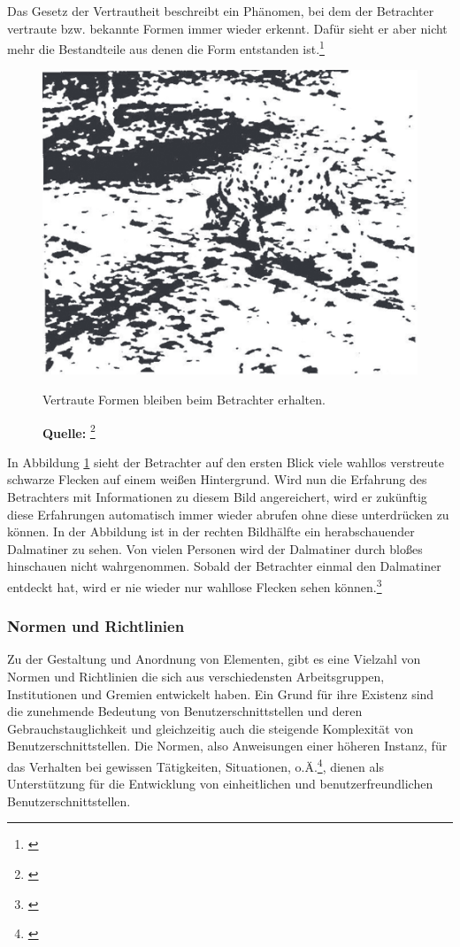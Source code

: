 Das Gesetz der Vertrautheit beschreibt ein Phänomen, bei dem der Betrachter vertraute bzw. bekannte Formen immer wieder erkennt. Dafür sieht er aber nicht mehr die Bestandteile aus denen die Form entstanden ist.\footnote{\cite[vgl.][63f]{Dahm2006}}
\begin{figure}[H]
  \centering
  \includegraphics[scale=0.7]{img/gesetz_der_Vertrautheit.PNG}
  \caption{Vertraute Formen bleiben beim Betrachter erhalten.}
  \caption*{\textbf{Quelle:} \footnote{\cite{Dahm2006}}}
  \label{fig:vertrautheit}
\end{figure}
In Abbildung \ref{fig:vertrautheit} sieht der Betrachter auf den ersten Blick viele wahllos verstreute schwarze Flecken auf einem weißen Hintergrund. Wird nun die Erfahrung des Betrachters mit Informationen zu diesem Bild angereichert, wird er zukünftig diese Erfahrungen automatisch immer wieder abrufen ohne diese unterdrücken zu können. In der Abbildung ist in der rechten Bildhälfte ein herabschauender Dalmatiner zu sehen. Von vielen Personen wird der Dalmatiner durch bloßes hinschauen nicht wahrgenommen. Sobald der Betrachter einmal den Dalmatiner entdeckt hat, wird er nie wieder nur wahllose Flecken sehen können.\footnote{\cite[vgl.][63f]{Dahm2006}}


\subsubsection{Normen und Richtlinien}
\label{sec:normenUndRichtlinien}
Zu der Gestaltung und Anordnung von Elementen, gibt es eine Vielzahl von Normen und Richtlinien die sich aus verschiedensten Arbeitsgruppen, Institutionen und Gremien entwickelt haben. Ein Grund für ihre Existenz sind die zunehmende Bedeutung von Benutzerschnittstellen und deren Gebrauchstauglichkeit und gleichzeitig auch die steigende Komplexität von Benutzerschnittstellen. Die Normen, also Anweisungen einer höheren Instanz, für das Verhalten bei gewissen Tätigkeiten, Situationen, o.Ä.\footnote{\cite[vgl.][]{duden}}, dienen als Unterstützung für die Entwicklung von einheitlichen und benutzerfreundlichen Benutzerschnittstellen. 

